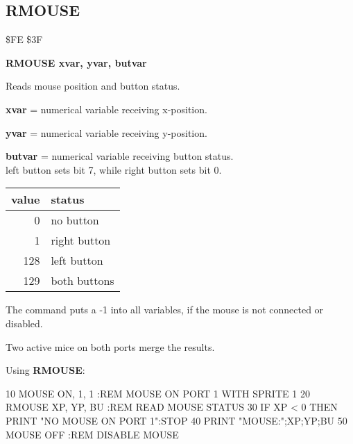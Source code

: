 \subsection{RMOUSE}
\begin{description}[leftmargin=3cm,style=nextline]
\item [Token:] \$FE \$3F
\item [Format:] {\bf RMOUSE xvar, yvar, butvar}
\item [Usage:] Reads mouse position and button status.

               {\bf xvar} = numerical variable receiving x-position.

               {\bf yvar} = numerical variable receiving y-position.

               {\bf butvar} = numerical variable receiving button status. \\
               left button sets bit 7, while right button sets bit 0.

\ttfamily
{\setlength{\tabcolsep}{1mm}
\begin{tabular}{|r|l|}
\hline
 value  & status \\
\hline
  0 & no button \\
  1 & right button \\
128 & left button \\
129 & both buttons \\
\hline
\end{tabular}
}

                 The command puts a -1 into all variables,
                 if the mouse is not connected or disabled.

\item [Remarks:] Two active mice on both ports merge the results.
\item [Example:] Using {\bf RMOUSE}:
\begin{screenoutput}
 10 MOUSE ON, 1, 1        :REM MOUSE ON PORT 1 WITH SPRITE 1
 20 RMOUSE XP, YP, BU     :REM READ MOUSE STATUS
 30 IF XP < 0 THEN PRINT "NO MOUSE ON PORT 1":STOP
 40 PRINT "MOUSE:";XP;YP;BU
 50 MOUSE OFF             :REM DISABLE MOUSE
\end{screenoutput}
\end{description}


\newpage
